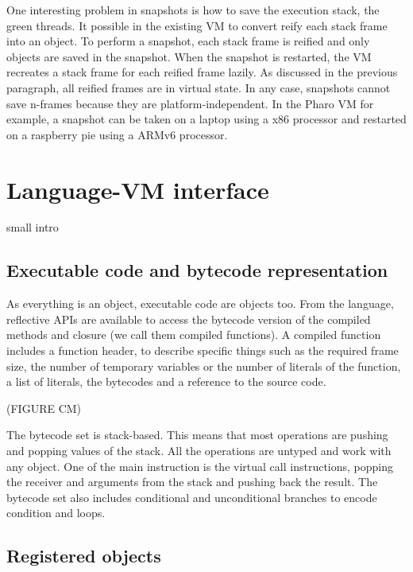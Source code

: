 \documentclass[a4paper,12pt,twoside]{../includes/ThesisStyle}
\begin{document}
One interesting problem in snapshots is how to save the execution stack, \ie the green threads. It possible in the existing VM to convert reify each stack frame into an object. To perform a snapshot, each stack frame is reified and only objects are saved in the snapshot. When the snapshot is restarted, the VM recreates a stack frame for each reified frame lazily. As discussed in the previous paragraph, all reified frames are in virtual state. In any case, snapshots cannot save n-frames because they are platform-independent. In the Pharo VM for example, a snapshot can be taken on a laptop using a x86 processor and restarted on a raspberry pie using a ARMv6 processor.



\section{Language-VM interface}

small intro

\subsection{Executable code and bytecode representation}

As everything is an object, executable code are objects too. From the language, reflective APIs are available to access the bytecode version of the compiled methods and closure (we call them compiled functions). A compiled function includes a function header, to describe specific things such as the required frame size, the number of temporary variables or the number of literals of the function, a list of literals, the bytecodes and a reference to the source code. 

(FIGURE CM)

The bytecode set is stack-based. This means that most operations are pushing and popping values of the stack. All the operations are untyped and work with any object. One of the main instruction is the virtual call instructions, popping the receiver and arguments from the stack and pushing back the result. The bytecode set also includes conditional and unconditional branches to encode condition and loops.

\subsection{Registered objects}
\end{document}
